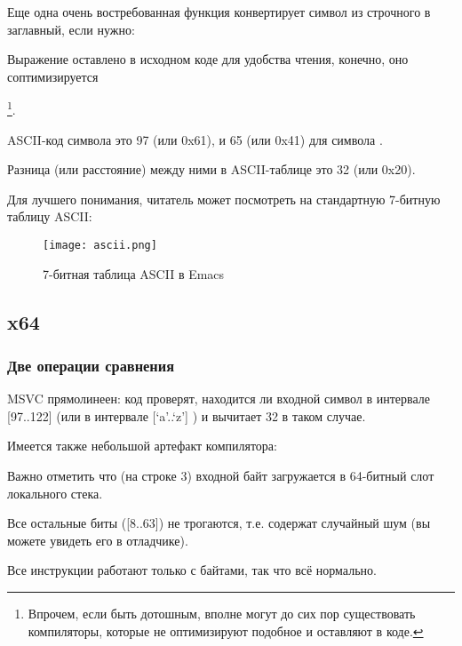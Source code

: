 
Еще одна очень востребованная функция конвертирует символ из строчного в заглавный, если нужно:



Выражение  оставлено в исходном коде для удобства чтения, 
конечно, оно соптимизируется

\footnote{Впрочем, если быть дотошным, вполне могут до сих пор существовать компиляторы,
которые не оптимизируют подобное и оставляют в коде.}.

\ac{ASCII}-код символа  это 97 (или 0x61), и 65 (или 0x41) для символа .

Разница (или расстояние) между ними в \ac{ASCII}-таблице это 32 (или 0x20).

Для лучшего понимания, читатель может посмотреть на стандартную 7-битную таблицу \ac{ASCII}:

\begin{figure}[H]
\centering
\texttt{[image: ascii.png]}
\caption{7-битная таблица \ac{ASCII} в Emacs}
\end{figure}

\subsection{x64}

\subsubsection{Две операции сравнения}

\NonOptimizing MSVC прямолинеен: код проверят, находится ли входной символ в интервале [97..122]
(или в интервале [`a'..`z'] ) и вычитает 32 в таком случае.

Имеется также небольшой артефакт компилятора:



Важно отметить что (на строке 3) входной байт загружается в 64-битный слот локального стека.

Все остальные биты ([8..63]) не трогаются, т.е. содержат случайный шум (вы можете увидеть его в отладчике).

Все инструкции работают только с байтами, так что всё нормально.

